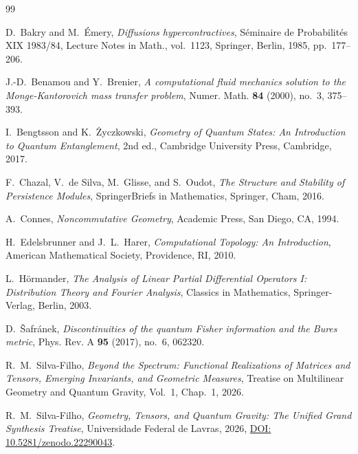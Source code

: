 \documentclass[11pt,a4paper,reqno]{amsart}
\theoremstyle{definition}
\numberwithin{equation}{section}
\begin{document}
\begin{thebibliography}{99}

D.~Bakry and M.~{\'E}mery,
\emph{Diffusions hypercontractives},
S{\'e}minaire de Probabilit{\'e}s XIX 1983/84, Lecture Notes in Math., vol.~1123, Springer, Berlin, 1985, pp.~177--206.

J.-D.~Benamou and Y.~Brenier,
\emph{A computational fluid mechanics solution to the Monge-Kantorovich mass transfer problem},
Numer. Math. \textbf{84} (2000), no.~3, 375--393.

I.~Bengtsson and K.~{\.Z}yczkowski,
\emph{Geometry of Quantum States: An Introduction to Quantum Entanglement},
2nd ed., Cambridge University Press, Cambridge, 2017.

F.~Chazal, V.~de Silva, M.~Glisse, and S.~Oudot,
\emph{The Structure and Stability of Persistence Modules},
SpringerBriefs in Mathematics, Springer, Cham, 2016.

A.~Connes,
\emph{Noncommutative Geometry},
Academic Press, San Diego, CA, 1994.

H.~Edelsbrunner and J.~L.~Harer,
\emph{Computational Topology: An Introduction},
American Mathematical Society, Providence, RI, 2010.

L.~H{\"o}rmander,
\emph{The Analysis of Linear Partial Differential Operators I: Distribution Theory and Fourier Analysis},
Classics in Mathematics, Springer-Verlag, Berlin, 2003.

D.~{\v{S}}afr{\'a}nek,
\emph{Discontinuities of the quantum Fisher information and the Bures metric},
Phys. Rev. A \textbf{95} (2017), no.~6, 062320.

R.~M.~Silva-Filho,
\emph{Beyond the Spectrum: Functional Realizations of Matrices and Tensors, Emerging Invariants, and Geometric Measures},
Treatise on Multilinear Geometry and Quantum Gravity, Vol.~1, Chap.~1, 2026.

R.~M.~Silva-Filho,
\emph{Geometry, Tensors, and Quantum Gravity: The Unified Grand Synthesis Treatise},
Universidade Federal de Lavras, 2026, \href{https://doi.org/10.5281/zenodo.22290043}{DOI: 10.5281/zenodo.22290043}.


\end{thebibliography}
\end{document}
